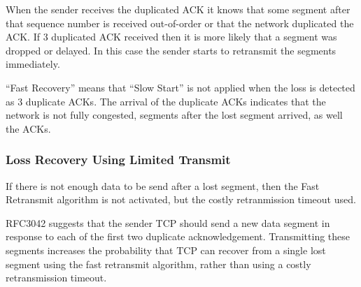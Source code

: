 When the sender receives the duplicated ACK it knows that some
segment after that sequence number is received out-of-order or
that the network duplicated the ACK. If 3 duplicated ACK received
then it is more likely that a segment was dropped or delayed.
In this case the sender starts to retransmit the segments
immediately.

``Fast Recovery'' means that ``Slow Start'' is not applied
when the loss is detected as 3 duplicate ACKs. The arrival
of the duplicate ACKs indicates that the network is not fully
congested, segments after the lost segment arrived, as well
the ACKs.

% 
% 
% 
% 
% 
% 

\subsubsection*{Loss Recovery Using Limited Transmit}

If there is not enough data to be send after a lost segment,
then the Fast Retransmit algorithm is not activated, but the
costly retranmission timeout used.

RFC3042 suggests that the sender TCP should send a new data segment
in response to each of the first two duplicate acknowledgement. Transmitting
these segments increases the probability that TCP can recover from a single
lost segment using the fast retransmit algorithm, rather than using a costly
retransmission timeout.

